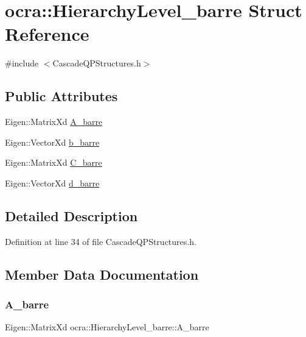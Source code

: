 \hypertarget{structocra_1_1HierarchyLevel__barre}{}\section{ocra\+:\+:Hierarchy\+Level\+\_\+barre Struct Reference}
\label{structocra_1_1HierarchyLevel__barre}


{\ttfamily \#include $<$Cascade\+Q\+P\+Structures.\+h$>$}

\subsection*{Public Attributes}
\begin{DoxyCompactItemize}
\item 
Eigen\+::\+Matrix\+Xd \hyperlink{structocra_1_1HierarchyLevel__barre_a9e0797af20a5547e4c7b88d648e9a152}{A\+\_\+barre}
\item 
Eigen\+::\+Vector\+Xd \hyperlink{structocra_1_1HierarchyLevel__barre_a4b34116dea6da686e3b491a673adabde}{b\+\_\+barre}
\item 
Eigen\+::\+Matrix\+Xd \hyperlink{structocra_1_1HierarchyLevel__barre_a3d60346fbdc2ff5c366b6b5f7b802af1}{C\+\_\+barre}
\item 
Eigen\+::\+Vector\+Xd \hyperlink{structocra_1_1HierarchyLevel__barre_a65cc4a8fa90c825809493c2bbc921a3d}{d\+\_\+barre}
\end{DoxyCompactItemize}


\subsection{Detailed Description}


Definition at line 34 of file Cascade\+Q\+P\+Structures.\+h.



\subsection{Member Data Documentation}
\hypertarget{structocra_1_1HierarchyLevel__barre_a9e0797af20a5547e4c7b88d648e9a152}{}\label{structocra_1_1HierarchyLevel__barre_a9e0797af20a5547e4c7b88d648e9a152} 
\subsubsection{\texorpdfstring{A\+\_\+barre}{A\_barre}}
{\footnotesize\ttfamily Eigen\+::\+Matrix\+Xd ocra\+::\+Hierarchy\+Level\+\_\+barre\+::\+A\+\_\+barre}



